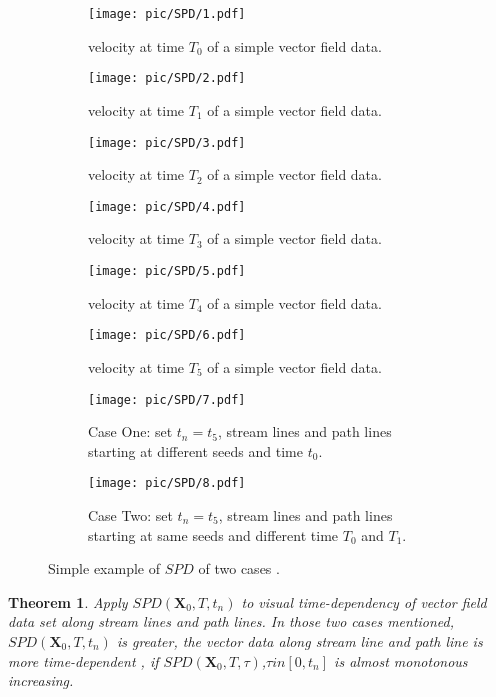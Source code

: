 \documentclass[
     11pt,         %
     a4paper,      %
     oneside,
     ]{article}
\newtheorem{mytheory}{Theorem}
\newcommand{\vect}[1]{\boldsymbol{#1}}
\begin{document}
	\begin{figure}[H]
		\begin{subfigure}{0.3\textwidth}
			\centering
			\texttt{[image: pic/SPD/1.pdf]}
			\caption{{\tiny velocity at time $T_{0}$ of a simple vector field data.}}
			\label{fig:SPDT0}
		\end{subfigure}
		\begin{subfigure}{0.3\textwidth}
			\centering
			\texttt{[image: pic/SPD/2.pdf]}
			\caption{{\tiny velocity at time $T_{1}$ of a simple vector field data.}}
			\label{fig:SPDT1}
		\end{subfigure}
		\begin{subfigure}{0.3\textwidth}
			\centering
			\texttt{[image: pic/SPD/3.pdf]}
			\caption{{\tiny velocity at time $T_{2}$ of a simple vector field data.}}
			\label{fig:SPDT2}
		\end{subfigure}
		\begin{subfigure}{0.3\textwidth}
		    \centering
			\texttt{[image: pic/SPD/4.pdf]}
			\caption{{\tiny velocity at time $T_{3}$ of a simple vector field data.}}
			\label{fig:SPDT3}
		\end{subfigure}
		\begin{subfigure}{0.3\textwidth}
			\centering
			\texttt{[image: pic/SPD/5.pdf]}
			\caption{{\tiny velocity at time $T_{4}$ of a simple vector field data.}}
			\label{fig:SPDT4}
		\end{subfigure}
		\begin{subfigure}{0.3\textwidth}
			\centering
			\texttt{[image: pic/SPD/6.pdf]}
			\caption{{\tiny velocity at time $T_{5}$ of a simple vector field data.}}
			\label{fig:SPDT5}
		\end{subfigure}
		\begin{subfigure}{0.45\textwidth}
			\centering
			\texttt{[image: pic/SPD/7.pdf]}
			\caption{{\tiny Case One: set $t_{n}=t_{5}$, stream lines and path lines starting at different seeds and time $t_{0}$.}}
			\label{fig:differentseeds}
		\end{subfigure}
		\begin{subfigure}{0.45\textwidth}
			\centering
			\texttt{[image: pic/SPD/8.pdf]}
			\caption{{\tiny Case Two: set $t_{n}=t_{5}$, stream lines and path lines starting at same seeds and different time $T_{0}$ and $T_{1}$.}}
			\label{fig:differenttime}
		\end{subfigure}
		\caption{{\tiny Simple example of $SPD$ of two cases .}}
		\label{fig:SPDCompare}
	\end{figure}
    \begin{mytheory}
    	Apply $SPD(\vect{X}_{0},T,t_{n})$ to visual time-dependency of vector field data set along stream lines and path lines. In those two cases mentioned, $SPD(\vect{X}_{0},T,t_{n})$ is greater, the vector data along stream line and path line is more time-dependent , if $SPD(\vect{X}_{0},T,\tau)$,$\tau in [0, t_{n}]$ is almost monotonous increasing. 
    	\label{Theo:SPD}
    \end{mytheory}
\end{document}
